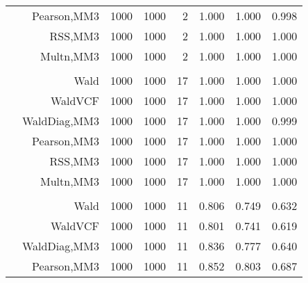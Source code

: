 \documentclass[
]{article}
\begin{document}
\begin{table}[H]
{\begin{tabular}[t]{lrrrrrrr}
\hspace{1em} & Pearson,MM3 & 1000 & 1000 & 2 & 1.000 & 1.000 & 0.998\\

\hspace{1em} & RSS,MM3 & 1000 & 1000 & 2 & 1.000 & 1.000 & 1.000\\

\hspace{1em} & Multn,MM3 & 1000 & 1000 & 2 & 1.000 & 1.000 & 1.000\\
\cmidrule{1-8}
\addlinespace[0.3em]
\multicolumn{8}{l}{\textbf{1F 15V}}\\
\hspace{1em} & Wald & 1000 & 1000 & 17 & 1.000 & 1.000 & 1.000\\

\hspace{1em} & WaldVCF & 1000 & 1000 & 17 & 1.000 & 1.000 & 1.000\\

\hspace{1em} & WaldDiag,MM3 & 1000 & 1000 & 17 & 1.000 & 1.000 & 0.999\\

\hspace{1em} & Pearson,MM3 & 1000 & 1000 & 17 & 1.000 & 1.000 & 1.000\\

\hspace{1em} & RSS,MM3 & 1000 & 1000 & 17 & 1.000 & 1.000 & 1.000\\

\hspace{1em} & Multn,MM3 & 1000 & 1000 & 17 & 1.000 & 1.000 & 1.000\\
\cmidrule{1-8}
\addlinespace[0.3em]
\multicolumn{8}{l}{\textbf{2F 10V}}\\
\hspace{1em} & Wald & 1000 & 1000 & 11 & 0.806 & 0.749 & 0.632\\

\hspace{1em} & WaldVCF & 1000 & 1000 & 11 & 0.801 & 0.741 & 0.619\\

\hspace{1em} & WaldDiag,MM3 & 1000 & 1000 & 11 & 0.836 & 0.777 & 0.640\\

\hspace{1em} & Pearson,MM3 & 1000 & 1000 & 11 & 0.852 & 0.803 & 0.687\\


\end{tabular}}
\end{table}
\end{document}
